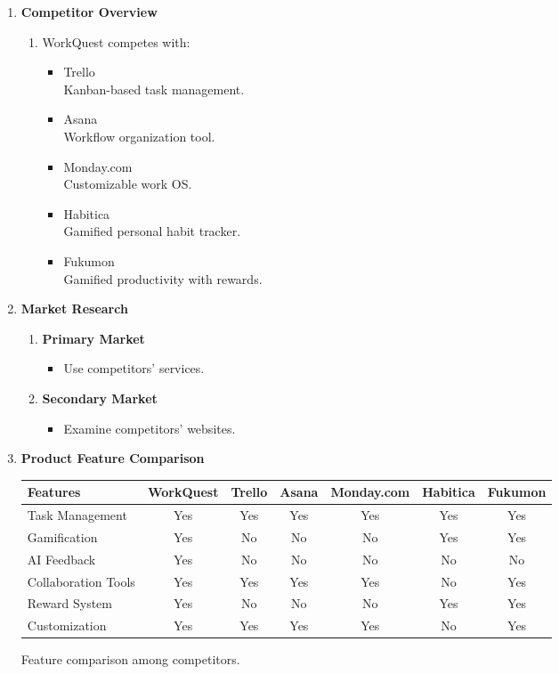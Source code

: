 \begin{enumerate}

    \item \textbf{Competitor Overview}
    \begin{enumerate}
        \item WorkQuest competes with:
        \begin{itemize}
            \item Trello \\ Kanban-based task management.
            \item Asana \\ Workflow organization tool.
            \item Monday.com \\ Customizable work OS.
            \item Habitica \\ Gamified personal habit tracker.
            \item Fukumon \\ Gamified productivity with rewards.
        \end{itemize}
    \end{enumerate}
    
    \item \textbf{Market Research}
    \begin{enumerate}
        \item \textbf{Primary Market}
        \begin{itemize}
            \item Use competitors’ services.
        \end{itemize}
        
        \item \textbf{Secondary Market}
        \begin{itemize}
            \item Examine competitors’ websites.
        \end{itemize}
    \end{enumerate}

    \item \textbf{Product Feature Comparison}

    \medskip
    \noindent\begin{center}
    \begin{tabular}{lcccccc}
    \hline
    Features & WorkQuest & Trello & Asana & Monday.com & Habitica & Fukumon \\
    \hline
    Task Management & Yes & Yes & Yes & Yes & Yes & Yes \\
    Gamification & Yes & No & No & No & Yes & Yes \\
    AI Feedback & Yes & No & No & No & No & No \\
    Collaboration Tools & Yes & Yes & Yes & Yes & No & Yes \\
    Reward System & Yes & No & No & No & Yes & Yes \\
    Customization & Yes & Yes & Yes & Yes & No & Yes \\
    \hline
    \end{tabular}
    \caption{Feature comparison among competitors.}
    \label{tab:feature-comparison}
    \end{center}
    \medskip


\end{enumerate}
